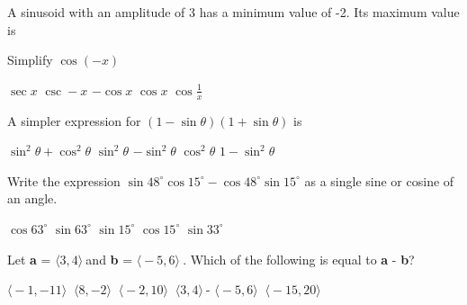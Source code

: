 \documentclass[addpoints]{exam}
\begin{document}
\begin{questions}
    \question[1] A sinusoid with an amplitude of 3 has a minimum value of -2. Its maximum value is
    
    \begin{oneparchoices}
        \end{oneparchoices}  \answerline
    
    
    \question[1] Simplify $\cos(-x)$
    
    \begin{oneparchoices}
        \choice $\sec x$
        \choice $\csc -x$
        \choice $-\cos x$
        \choice $\cos x$
        \choice $\cos \frac{1}{x}$
        \end{oneparchoices}  \answerline
    
    \question[1] A simpler expression for $(1 - \sin \theta)(1 + \sin \theta)$ is
    
    \begin{oneparchoices}
        \choice $\sin^2 \theta + \cos^2 \theta$
        \choice $\sin^2\theta$
        \choice $-\sin^2\theta$
        \choice $\cos^2\theta$
        \choice $1 - \sin^2 \theta$
        \end{oneparchoices}  \answerline
    
    \question[1] Write the expression $\sin 48^\circ \cos 15^\circ - \cos 48^\circ \sin 15^\circ$ as a single sine or cosine of an angle. 
    
    \begin{oneparchoices}
        \choice $\cos 63^\circ$
        \choice $\sin 63^\circ$
        \choice $\sin 15^\circ$
        \choice $\cos 15^\circ$
        \choice $\sin 33^\circ$
        \end{oneparchoices}  \answerline
    
    
    \question[1] Let \textbf{a} = $\big \langle 3, 4 \big \rangle\ $and \textbf{b} = $\big \langle -5, 6 \big \rangle\ $. Which of the following is equal to \textbf{a} - \textbf{b}?
    
    \begin{oneparchoices}
        \choice $\big \langle -1, -11 \big \rangle\ $
        \choice $\big \langle 8, -2 \big \rangle\ $
        \choice $\big \langle -2, 10 \big \rangle\ $
        \choice $\big \langle 3, 4 \big \rangle\ $- $\big \langle -5, 6 \big \rangle\ $
        \choice $\big \langle -15, 20 \big \rangle\ $
        \end{oneparchoices}  \answerline
    

\end{questions}
\end{document}
